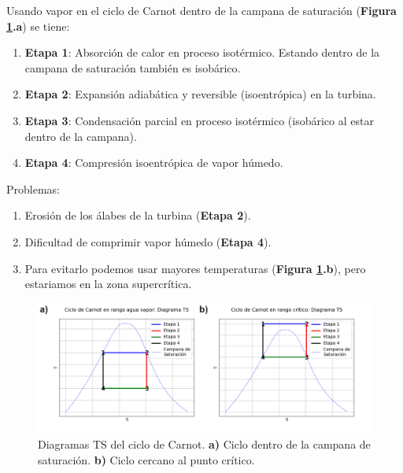         Usando vapor en el ciclo de Carnot dentro de la campana de saturación (\textbf{Figura \ref{fig:ciclo_carnot_ts}.a}) se tiene:
        
        \begin{multicols}{2}
            \begin{enumerate}
                \item \textbf{Etapa 1}: Absorción de calor en proceso isotérmico. Estando dentro de la campana de saturación también es isobárico.
                \item \textbf{Etapa 2}: Expansión adiabática y reversible (isoentrópica) en la turbina.
                \item \textbf{Etapa 3}: Condensación parcial en proceso isotérmico (isobárico al estar dentro de la campana).
                \item \textbf{Etapa 4}: Compresión isoentrópica de vapor húmedo.
            \end{enumerate}
        \end{multicols}
        
        Problemas:
        
        \begin{multicols}{2}
            \begin{enumerate}
                \item Erosión de los álabes de la turbina (\textbf{Etapa 2}).
                \item Dificultad de comprimir vapor húmedo (\textbf{Etapa 4}).
                \item Para evitarlo podemos usar mayores temperaturas (\textbf{Figura \ref{fig:ciclo_carnot_ts}.b}), pero estariamos en la zona supercrítica.
            \end{enumerate}
        \end{multicols}
        
        \begin{figure}
            \includegraphics[width=\textwidth]{img/ciclos/ciclo_carnot_ts.png}
            \caption[Diagramas TS del ciclo de Carnot]{Diagramas TS del ciclo de Carnot. \textbf{a)} Ciclo dentro de la campana de saturación. \textbf{b)} Ciclo cercano al punto crítico.}
            \label{fig:ciclo_carnot_ts}
        \end{figure}
        
